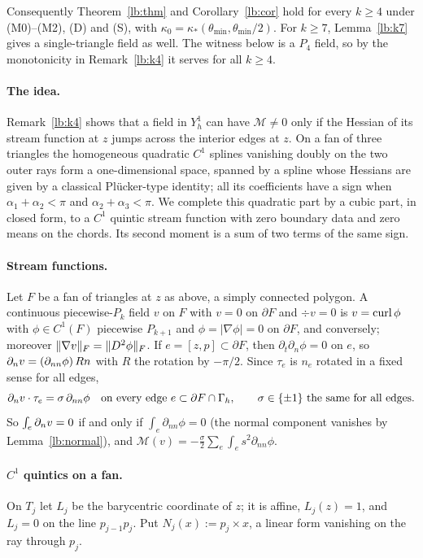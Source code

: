 Consequently Theorem~\ref{lb:thm} and Corollary~\ref{lb:cor} hold for every $k\ge4$ under (M0)--(M2), (D) and (S), with $\kappa_0=\kappa_\ast(\theta_{\min},\theta_{\min}/2)$. For $k\ge7$, Lemma~\ref{lb:k7} gives a single-triangle field as well. The witness below is a $P_4$ field, so by the monotonicity in Remark~\ref{lb:k4} it serves for all $k\ge4$.

\paragraph{The idea.} Remark~\ref{lb:k4} shows that a field in $Y_h^1$ can have $\mathcal M\ne0$ only if the Hessian of its stream function at $z$ jumps across the interior edges at $z$. On a fan of three triangles the homogeneous quadratic $C^1$ splines vanishing doubly on the two outer rays form a one-dimensional space, spanned by a spline whose Hessians are given by a classical Pl\"ucker-type identity; all its coefficients have a sign when $\alpha_1+\alpha_2<\pi$ and $\alpha_2+\alpha_3<\pi$. We complete this quadratic part by a cubic part, in closed form, to a $C^1$ quintic stream function with zero boundary data and zero means on the chords. Its second moment is a sum of two terms of the same sign.

\paragraph{Stream functions.}
Let $F$ be a fan of triangles at $z$ as above, a simply connected polygon. A continuous piecewise-$P_k$ field $v$ on $F$ with $v=0$ on $\partial F$ and $\div v=0$ is $v=\operatorname{curl}\phi$ with $\phi\in C^1(F)$ piecewise $P_{k+1}$ and $\phi=|\nabla\phi|=0$ on $\partial F$, and conversely; moreover $\lVert \nabla v\rVert_F=\lVert D^2\phi\rVert_F$. If $e=[z,p]\subset\partial F$, then $\partial_t\partial_n\phi=0$ on $e$, so $\partial_n v=(\partial_{nn}\phi)\,R n$ with $R$ the rotation by $-\pi/2$. Since $\tau_e$ is $n_e$ rotated in a fixed sense for all edges,
\begin{equation}\label{m3:dnv}
\partial_n v\cdot\tau_e=\sigma\,\partial_{nn}\phi\quad\text{on every edge }e\subset\partial F\cap\Gamma_h,\qquad\sigma\in\{\pm1\}\text{ the same for all edges}.
\end{equation}
So $\int_e\partial_n v=0$ if and only if $\int_e\partial_{nn}\phi=0$ (the normal component vanishes by Lemma~\ref{lb:normal}), and $\mathcal M(v)=-\tfrac\sigma2\sum_e\int_e s^2\partial_{nn}\phi$.

\paragraph{$C^1$ quintics on a fan.}
On $T_j$ let $L_j$ be the barycentric coordinate of $z$; it is affine, $L_j(z)=1$, and $L_j=0$ on the line $p_{j-1}p_j$. Put $N_j(x):=p_j\times x$, a linear form vanishing on the ray through $p_j$.

